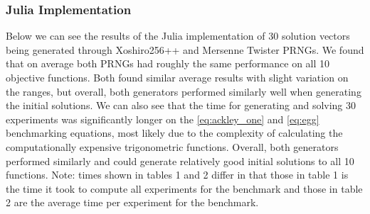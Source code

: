 \documentclass{article}
\begin{document}
        \subsubsection{Julia Implementation}
Below we can see the results of the Julia implementation of 30 solution vectors being generated through Xoshiro256++ and Mersenne Twister PRNGs. We found that on average both PRNGs had roughly the same performance on all 10 objective functions. Both found similar average results with slight variation on the ranges, but overall, both generators performed similarly well when generating the initial solutions. We can also see that the time for generating and solving 30 experiments was significantly longer on the \ref{eq:ackley_one} and \ref{eq:egg} benchmarking equations, most likely due to the complexity of calculating the computationally expensive trigonometric functions. Overall, both generators performed similarly and could generate relatively good initial solutions to all 10 functions.  Note: times shown in tables 1 and 2 differ in that those in table 1 is the time it took to compute all experiments for the benchmark and those in table 2 are the average time per experiment for the benchmark.
\end{document}
